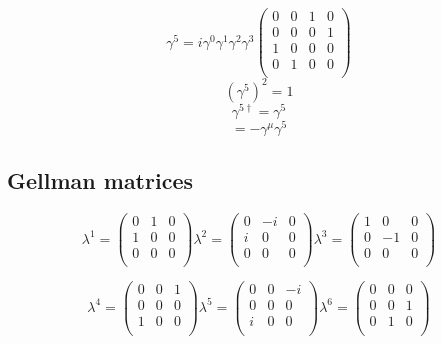 \begin{equation*}
	\gamma^{5} = i\gamma^{0}\gamma^{1}\gamma^{2}\gamma^{3}
\begin{pmatrix} 
	0 	& 	0	&	1	&	0 \\
	0 	& 	0	&	0	&	1 \\
	1 	& 	0	&	0	&	0 \\
	0 	& 	1	&	0	&	0 \\
\end{pmatrix}
\end{equation*}
\begin{equation*}
	(\gamma^{5})^{2} = 1
\end{equation*}
\begin{equation*}
	\gamma^{5\dagger} = \gamma^{5}
\end{equation*}
\begin{equation*}
	[\gamma^{5}, \gamma^{\mu}] = -\gamma^{\mu}\gamma^{5}
\end{equation*}


\subsection{Gellman matrices} %
\label{sub:gellman_matrices}
\begin{equation*}
	\lambda^{1} = 
\begin{pmatrix} 
	0 	& 	1	&	0 \\
	1 	& 	0	&	0 \\
	0 	& 	0	&	0 \\
\end{pmatrix}
	\lambda^{2} = 
\begin{pmatrix} 
	0 	& 	-i	&	0 \\
	i 	& 	0	&	0 \\
	0 	& 	0	&	0 \\
\end{pmatrix}
	\lambda^{3} = 
\begin{pmatrix} 
	1 	& 	0	&	0 \\
	0 	& 	-1	&	0 \\
	0 	& 	0	&	0 \\
\end{pmatrix}
\end{equation*}

\begin{equation*}
	\lambda^{4} = 
\begin{pmatrix} 
	0 	& 	0	&	1 \\
	0 	& 	0	&	0 \\
	1 	& 	0	&	0 \\
\end{pmatrix}
	\lambda^{5} = 
\begin{pmatrix} 
	0 	& 	0	&	-i \\
	0 	& 	0	&	0 \\
	i 	& 	0	&	0 \\
\end{pmatrix}
	\lambda^{6} = 
\begin{pmatrix} 
	0 	& 	0	&	0 \\
	0 	& 	0	&	1 \\
	0 	& 	1	&	0 \\
\end{pmatrix}
\end{equation*}

